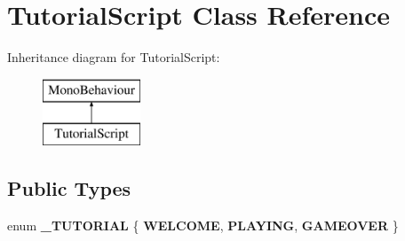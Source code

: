 \hypertarget{class_tutorial_script}{}\section{Tutorial\+Script Class Reference}
\label{class_tutorial_script}
Inheritance diagram for Tutorial\+Script\+:\begin{figure}[H]
\begin{center}
\leavevmode
\includegraphics[height=2.000000cm]{class_tutorial_script}
\end{center}
\end{figure}
\subsection*{Public Types}
\begin{DoxyCompactItemize}
\item 
\mbox{\label{class_tutorial_script_a4df778a9d233c279e7b66bd97b634a9b}} 
enum {\bfseries \+\_\+\+T\+U\+T\+O\+R\+I\+AL} \{ {\bfseries W\+E\+L\+C\+O\+ME}, 
{\bfseries P\+L\+A\+Y\+I\+NG}, 
{\bfseries G\+A\+M\+E\+O\+V\+ER}
 \}
\end{DoxyCompactItemize}
